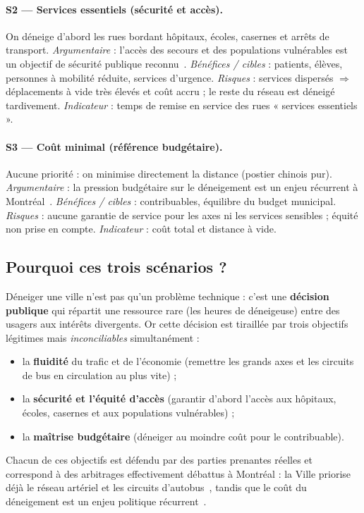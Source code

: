 \documentclass[11pt,a4paper]{article}
\begin{document}
\paragraph{S2 — Services essentiels (sécurité et accès).} On déneige d'abord les
rues bordant hôpitaux, écoles, casernes et arrêts de transport. \emph{Argumentaire}
: l'accès des secours et des populations vulnérables est un objectif de sécurité
publique reconnu~\cite{vdm}. \emph{Bénéfices / cibles} : patients, élèves,
personnes à mobilité réduite, services d'urgence. \emph{Risques} : services
dispersés $\Rightarrow$ déplacements à vide très élevés et coût accru ; le reste
du réseau est déneigé tardivement. \emph{Indicateur} : temps de remise en service
des rues « services essentiels ».

\paragraph{S3 — Coût minimal (référence budgétaire).} Aucune priorité : on
minimise directement la distance (postier chinois pur). \emph{Argumentaire} : la
pression budgétaire sur le déneigement est un enjeu récurrent à Montréal~\cite{lef19,vezina20}.
\emph{Bénéfices / cibles} : contribuables, équilibre du budget municipal.
\emph{Risques} : aucune garantie de service pour les axes ni les services
sensibles ; équité non prise en compte. \emph{Indicateur} : coût total et
distance à vide.

\subsection{Pourquoi ces trois scénarios ?}
Déneiger une ville n'est pas qu'un problème technique : c'est une \textbf{décision
publique} qui répartit une ressource rare (les heures de déneigeuse) entre des
usagers aux intérêts divergents. Or cette décision est tiraillée par trois
objectifs légitimes mais \emph{inconciliables} simultanément :
\begin{itemize}
\item la \textbf{fluidité} du trafic et de l'économie (remettre les grands axes
et les circuits de bus en circulation au plus vite) ;
\item la \textbf{sécurité et l'équité d'accès} (garantir d'abord l'accès aux
hôpitaux, écoles, casernes et aux populations vulnérables) ;
\item la \textbf{maîtrise budgétaire} (déneiger au moindre coût pour le
contribuable).
\end{itemize}
Chacun de ces objectifs est défendu par des parties prenantes réelles et
correspond à des arbitrages effectivement débattus à Montréal : la Ville
priorise déjà le réseau artériel et les circuits d'autobus~\cite{vdm,new18},
tandis que le coût du déneigement est un enjeu politique récurrent~\cite{lef19,vezina20}.
\end{document}
